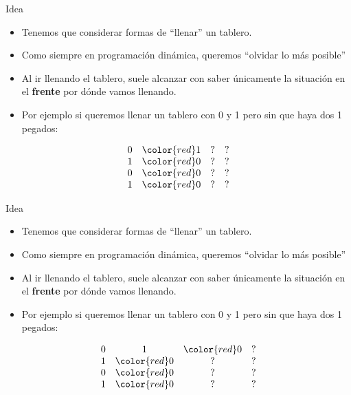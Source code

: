 \documentclass{beamer}
\begin{document}
\begin{frame}{Idea}
    \begin{itemize}
		\item Tenemos que considerar formas de ``llenar'' un tablero.
		\item Como siempre en programación dinámica, queremos ``olvidar lo más posible''
		\item Al ir llenando el tablero, suele alcanzar con saber únicamente la situación en el \textbf{frente} por dónde vamos llenando.
		\item Por ejemplo si queremos llenar un tablero con 0 y 1 pero sin que haya dos 1 pegados:
    \end{itemize}
    $$\begin{array}{cccc}
		0 & \color{red}1 & ? & ? \\
		1 & \color{red}0 & ? & ? \\
		0 & \color{red}0 & ? & ? \\
		1 & \color{red}0 & ? & ? \\
    \end{array}$$
\end{frame}

\begin{frame}{Idea}
    \begin{itemize}
		\item Tenemos que considerar formas de ``llenar'' un tablero.
		\item Como siempre en programación dinámica, queremos ``olvidar lo más posible''
		\item Al ir llenando el tablero, suele alcanzar con saber únicamente la situación en el \textbf{frente} por dónde vamos llenando.
		\item Por ejemplo si queremos llenar un tablero con 0 y 1 pero sin que haya dos 1 pegados:
    \end{itemize}
    $$\begin{array}{cccc}
		0 & 1 & \color{red}0 & ? \\
		1 & \color{red}0 & ? & ? \\
		0 & \color{red}0 & ? & ? \\
		1 & \color{red}0 & ? & ? \\
    \end{array}$$
\end{frame}
\end{document}
